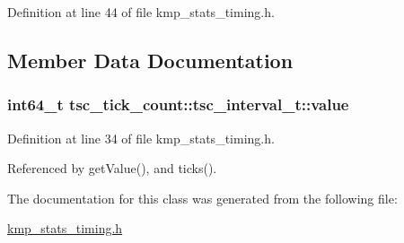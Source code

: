 Definition at line 44 of file kmp\-\_\-stats\-\_\-timing.\-h.



\subsection{Member Data Documentation}
\hypertarget{classtsc__tick__count_1_1tsc__interval__t_a3e9e7f09cabe4ad49dd6f7baa166486d}{
\subsubsection[{value}]{\setlength{\rightskip}{0pt plus 5cm}int64\-\_\-t tsc\-\_\-tick\-\_\-count\-::tsc\-\_\-interval\-\_\-t\-::value\hspace{0.3cm}{\ttfamily [private]}}}\label{classtsc__tick__count_1_1tsc__interval__t_a3e9e7f09cabe4ad49dd6f7baa166486d}


Definition at line 34 of file kmp\-\_\-stats\-\_\-timing.\-h.



Referenced by get\-Value(), and ticks().



The documentation for this class was generated from the following file\-:\begin{DoxyCompactItemize}
\item 
\hyperlink{kmp__stats__timing_8h}{kmp\-\_\-stats\-\_\-timing.\-h}\end{DoxyCompactItemize}
